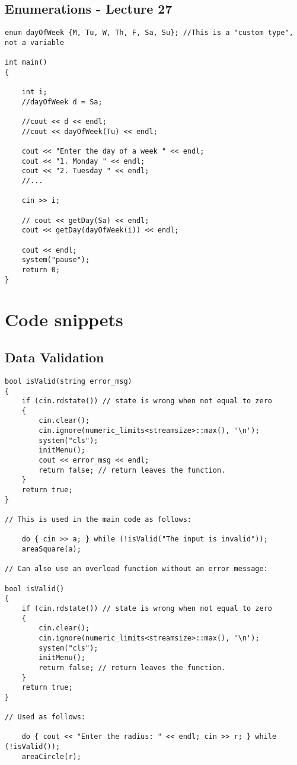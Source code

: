 \documentclass{article}
\begin{document}
\subsection{Enumerations - Lecture 27}
\begin{lstlisting}
enum dayOfWeek {M, Tu, W, Th, F, Sa, Su}; //This is a "custom type", not a variable

int main()
{

	int i;
	//dayOfWeek d = Sa;

	//cout << d << endl;
	//cout << dayOfWeek(Tu) << endl;

	cout << "Enter the day of a week " << endl;
	cout << "1. Monday " << endl;
	cout << "2. Tuesday " << endl;
	//...

	cin >> i;

	// cout << getDay(Sa) << endl;
	cout << getDay(dayOfWeek(i)) << endl;

	cout << endl;
	system("pause");
	return 0;
}

\end{lstlisting}











\section{Code snippets}
\subsection{Data Validation}
\begin{lstlisting}	
bool isValid(string error_msg)
{
	if (cin.rdstate()) // state is wrong when not equal to zero
	{
		cin.clear();
		cin.ignore(numeric_limits<streamsize>::max(), '\n');
		system("cls");
		initMenu();
		cout << error_msg << endl;
		return false; // return leaves the function.
	}
	return true;
}

// This is used in the main code as follows:

	do { cin >> a; } while (!isValid("The input is invalid"));
	areaSquare(a);

// Can also use an overload function without an error message:

bool isValid()
{
	if (cin.rdstate()) // state is wrong when not equal to zero
	{
		cin.clear();
		cin.ignore(numeric_limits<streamsize>::max(), '\n');
		system("cls");
		initMenu();
		return false; // return leaves the function.
	}
	return true;
}

// Used as follows:

	do { cout << "Enter the radius: " << endl; cin >> r; } while (!isValid());
	areaCircle(r);

\end{lstlisting}


\begin{lstlisting}

\end{lstlisting}

\begin{lstlisting}

\end{lstlisting}

\begin{lstlisting}

\end{lstlisting}
\end{document}
